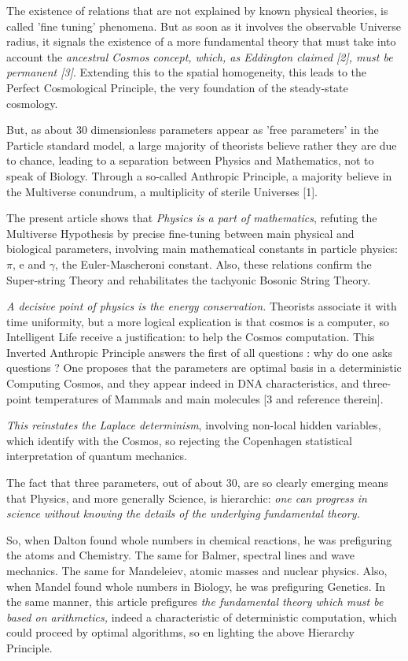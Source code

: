 \documentclass[twoside,draft]{article}
\begin{document}
\begin{sloppypar}
{The existence of relations that are not explained by known physical theories, is called 'fine tuning' phenomena. But as soon as it involves the observable Universe radius, it signals the existence of a more fundamental theory that must take into account the \textit{ancestral Cosmos concept, which, as Eddington claimed [2], must be permanent [3]}. Extending this to the spatial homogeneity, this leads to the Perfect Cosmological Principle, the very foundation of the steady-state cosmology.

But, as about 30 dimensionless parameters appear as 'free parameters' in the Particle standard model, a large majority of theorists believe rather they are due to chance, leading to a separation between Physics and Mathematics, not to speak of Biology. Through a so-called Anthropic Principle, a majority believe in the Multiverse conundrum, a multiplicity of sterile Universes [1].

The present article shows that \textit{Physics is a part of mathematics}, refuting the Multiverse Hypothesis by precise fine-tuning between main physical and biological parameters, involving main mathematical constants in particle physics: $\pi$,  e and $\gamma$, the Euler-Mascheroni constant. Also, these relations confirm the Super-string Theory and rehabilitates the tachyonic Bosonic String Theory.

\textit{A decisive point of physics is the energy conservation.} Theorists associate it with time uniformity, but a more logical explication is that cosmos is a computer, so Intelligent Life receive a justification: to help the Cosmos computation. This Inverted Anthropic Principle answers the first of all questions : why do one asks questions ? One proposes that the parameters are optimal basis in a deterministic Computing Cosmos, and they appear indeed in DNA characteristics, and three-point temperatures of Mammals and main molecules [3 and reference therein].

\textit{This reinstates the Laplace determinism}, involving non-local hidden variables, which identify with the Cosmos, so rejecting the Copenhagen statistical interpretation of quantum mechanics.

The fact that three parameters, out of about 30, are so clearly emerging means that Physics, and more generally Science, is hierarchic: \textit{one can progress in science without knowing the details of the underlying fundamental theory.}

So, when Dalton found whole numbers in chemical reactions, he was prefiguring the atoms and Chemistry. The same for Balmer, spectral lines and wave mechanics. The same for Mandeleiev, atomic masses and nuclear physics. Also, when Mandel found whole numbers in Biology, he was prefiguring Genetics. In the same manner, this article prefigures \textit{the fundamental theory which must be based on arithmetics,} indeed a characteristic of deterministic computation, which could proceed by optimal algorithms, so en lighting the above Hierarchy Principle.

}
\end{sloppypar}
\end{document}
